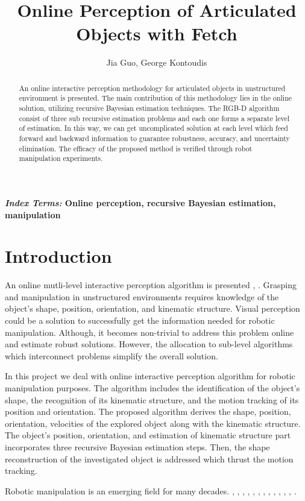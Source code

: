 \documentclass[letterpaper, 10 pt, conference]{ieeeconf}
\title{\LARGE \bf Online Perception of Articulated Objects with Fetch}
\author{Jia Guo, George Kontoudis}
\begin{document}
\maketitle
\thispagestyle{empty}
\pagestyle{empty}

\begin{abstract}
An online interactive perception methodology for articulated objects in unstructured environment is presented. The main contribution of this methodology lies in the online solution, utilizing recursive Bayesian estimation techniques. The RGB-D algorithm consist of three sub recursive estimation problems and each one forms a separate level of estimation. In this way, we can get uncomplicated solution at each level which feed forward and backward information to guarantee robustness, accuracy, and uncertainty elimination. The efficacy of the proposed method is verified through robot manipulation experiments.     
\end{abstract}

\normalsize{\bf\small\emph{Index Terms:} Online perception, recursive Bayesian estimation, manipulation}  

\section{Introduction}\label{intro}
An online mutli-level interactive perception algorithm is presented \cite{martin2014online}, \cite{martin2016integrated}. Grasping and manipulation in unstructured environments requires knowledge of the object's shape, position, orientation, and kinematic structure. Visual perception could be a solution to successfully get the information needed for robotic manipulation. Although, it becomes non-trivial to address this problem online and estimate robust solutions. However, the allocation to sub-level algorithms which interconnect problems simplify the overall solution.

In this project we deal with online interactive perception algorithm for robotic manipulation purposes. The algorithm includes the identification of the object's shape, the recognition of its kinematic structure, and the motion tracking of its position and orientation. The proposed algorithm derives the shape, position, orientation, velocities of the explored object along with the kinematic structure. The object's position, orientation, and estimation of kinematic structure part incorporates three recursive Bayesian estimation steps. Then, the shape reconstruction of the investigated object is addressed which thrust the motion tracking.

Robotic manipulation is an emerging field for many decades. \cite{chang2012interactive}, \cite{sturm2010vision}, \cite{katz2014interactive}, \cite{thrun2005probabilistic}, \cite{tomasi1991detection}, \cite{brock2009learning}, \cite{krainin2011manipulator}, \cite{wuthrich2013probabilistic}, \cite{choi2013rgb}, \cite{mishra2009active}, \cite{yuheng2013star3d}, \cite{herbst2014toward}, \cite{pomerleau2011tracking}.




\end{document}
